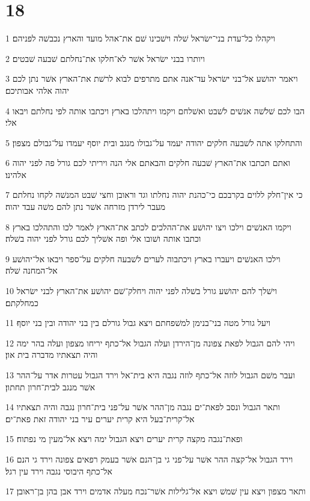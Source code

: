 \chapter{18}

\par 1 ויקהלו כל־עדת בני־ישׂראל שׁלה וישׁכינו שׁם את־אהל מועד והארץ נכבשׁה לפניהם׃
\par 2 ויותרו בבני ישׂראל אשׁר לא־חלקו את־נחלתם שׁבעה שׁבטים׃
\par 3 ויאמר יהושׁע אל־בני ישׂראל עד־אנה אתם מתרפים לבוא לרשׁת את־הארץ אשׁר נתן לכם יהוה אלהי אבותיכם׃
\par 4 הבו לכם שׁלשׁה אנשׁים לשׁבט ואשׁלחם ויקמו ויתהלכו בארץ ויכתבו אותה לפי נחלתם ויבאו אלי׃
\par 5 והתחלקו אתה לשׁבעה חלקים יהודה יעמד על־גבולו מנגב ובית יוסף יעמדו על־גבולם מצפון׃
\par 6 ואתם תכתבו את־הארץ שׁבעה חלקים והבאתם אלי הנה ויריתי לכם גורל פה לפני יהוה אלהינו׃
\par 7 כי אין־חלק ללוים בקרבכם כי־כהנת יהוה נחלתו וגד וראובן וחצי שׁבט המנשׁה לקחו נחלתם מעבר לירדן מזרחה אשׁר נתן להם משׁה עבד יהוה׃
\par 8 ויקמו האנשׁים וילכו ויצו יהושׁע את־ההלכים לכתב את־הארץ לאמר לכו והתהלכו בארץ וכתבו אותה ושׁובו אלי ופה אשׁליך לכם גורל לפני יהוה בשׁלה׃
\par 9 וילכו האנשׁים ויעברו בארץ ויכתבוה לערים לשׁבעה חלקים על־ספר ויבאו אל־יהושׁע אל־המחנה שׁלה׃
\par 10 וישׁלך להם יהושׁע גורל בשׁלה לפני יהוה ויחלק־שׁם יהושׁע את־הארץ לבני ישׂראל כמחלקתם׃
\par 11 ויעל גורל מטה בני־בנימן למשׁפחתם ויצא גבול גורלם בין בני יהודה ובין בני יוסף׃
\par 12 ויהי להם הגבול לפאת צפונה מן־הירדן ועלה הגבול אל־כתף יריחו מצפון ועלה בהר ימה והיה תצאתיו מדברה בית און׃
\par 13 ועבר משׁם הגבול לוזה אל־כתף לוזה נגבה היא בית־אל וירד הגבול עטרות אדר על־ההר אשׁר מנגב לבית־חרון תחתון׃
\par 14 ותאר הגבול ונסב לפאת־ים נגבה מן־ההר אשׁר על־פני בית־חרון נגבה והיה תצאתיו אל־קרית־בעל היא קרית יערים עיר בני יהודה זאת פאת־ים׃
\par 15 ופאת־נגבה מקצה קרית יערים ויצא הגבול ימה ויצא אל־מעין מי נפתוח׃
\par 16 וירד הגבול אל־קצה ההר אשׁר על־פני גי בן־הנם אשׁר בעמק רפאים צפונה וירד גי הנם אל־כתף היבוסי נגבה וירד עין רגל׃
\par 17 ותאר מצפון ויצא עין שׁמשׁ ויצא אל־גלילות אשׁר־נכח מעלה אדמים וירד אבן בהן בן־ראובן׃

